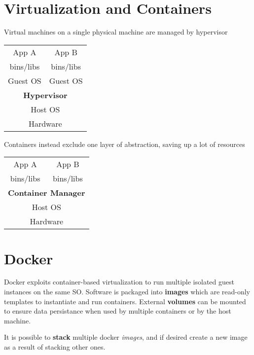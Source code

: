 \section{Virtualization and Containers}
\begin{paracol}{2}
   Virtual machines on a single physical machine are managed by hypervisor
   \begin{table}[!htbp]
      \centering
      \begin{tabular}{|cc|}
         \hline
         App A & App B\\
         bins/libs & bins/libs\\
         Guest OS & Guest OS\\
         \midrule
         \multicolumn{2}{|c|}{\textbf{Hypervisor}}\\
         \hline
         \multicolumn{2}{|c|}{Host OS}\\
         \hline
         \multicolumn{2}{|c|}{Hardware}\\
         \hline
      \end{tabular}
   
   \end{table}

   \vspace{\fill}
   \switchcolumn

   Containers instead exclude one layer of abstraction, saving up a lot of resources
   \vspace{\fill}
   \begin{table}[!htbp]
      \centering
      \begin{tabular}{|cc|}
         \hline
         App A & App B\\
         bins/libs & bins/libs\\
         \midrule
         \multicolumn{2}{|c|}{\textbf{Container Manager}}\\
         \hline
         \multicolumn{2}{|c|}{Host OS}\\
         \hline
         \multicolumn{2}{|c|}{Hardware}\\
         \hline
      \end{tabular}
   \end{table}

   \vspace{\fill}
\end{paracol}

\section{Docker}
Docker exploits container-based virtualization to run multiple isolated guest instances on the same SO.
Software is packaged into \textbf{images} which are read-only templates to instantiate and run containers.
External \textbf{volumes} can be mounted to ensure data persistance when used by multiple containers or by the host machine.

It is possible to \textbf{stack} multiple docker \textit{images},
and if desired create a new image as a result of stacking other ones.